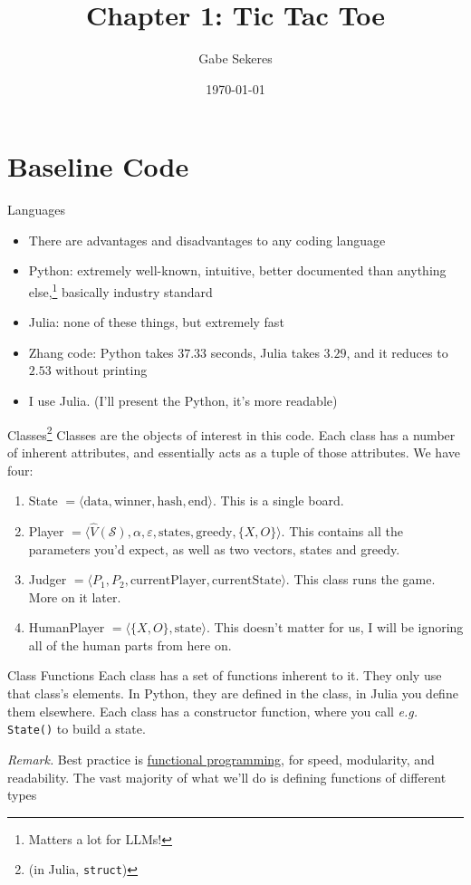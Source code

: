 \documentclass{beamer}
\title{Chapter 1: Tic Tac Toe}
\date{\today}
\author{Gabe Sekeres}
\institute{Cornell University}
\begin{document}
  \maketitle
  \section{Baseline Code}
  \begin{frame}{Languages}
  	\begin{itemize}[<+->]
  		\item There are advantages and disadvantages to any coding language
  		\item Python: extremely well-known, intuitive, better documented than anything else,\footnote{Matters a lot for LLMs!} basically industry standard
  		\item Julia: none of these things, but extremely fast
  		\item Zhang code: Python takes $37.33$ seconds, Julia takes $3.29$, and it reduces to $2.53$ without printing
  		\item I use Julia. (I'll present the Python, it's more readable)
  	\end{itemize}
  \end{frame}
  \begin{frame}{Classes\footnote{(in Julia, \texttt{struct})}}
    	Classes are the objects of interest in this code. Each class has a number of inherent attributes, and essentially acts as a tuple of those attributes. We have four:
    	\begin{enumerate}
    		\item State $= \langle \text{data}, \text{winner}, \text{hash}, \text{end}\rangle$. This is a single board.
    		\item Player $= \langle \hat{V}(\mathcal{S}),\alpha,\varepsilon,\text{states},\text{greedy},\{X,O\}\rangle$. This contains all the parameters you'd expect, as well as two vectors, states and greedy.
    		\item Judger $= \langle P_1,P_2,\text{currentPlayer},\text{currentState}\rangle$. This class runs the game. More on it later.
    		\item HumanPlayer $= \langle \{X,O\},\text{state}\rangle$. This doesn't matter for us, I will be ignoring all of the human parts from here on.
    	\end{enumerate}
  \end{frame}
  \begin{frame}{Class Functions}
  		Each class has a set of functions inherent to it. They only use that class's elements. In Python, they are defined in the class, in Julia you define them elsewhere. Each class has a constructor function, where you call \textit{e.g.} \texttt{State()} to build a state.
  		
  		\emph{Remark.} Best practice is \alert{\href{https://en.wikipedia.org/wiki/Functional_programming}{functional programming}}, for speed, modularity, and readability. The vast majority of what we'll do is defining functions of different types
  \end{frame}
\end{document}
